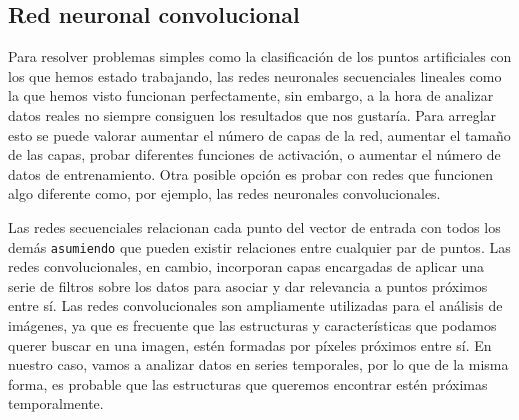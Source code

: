 \newpage
\subsection{Red neuronal convolucional}
Para resolver problemas simples como la clasificación de los puntos artificiales con los que hemos estado trabajando, las redes neuronales secuenciales lineales como la que hemos visto funcionan perfectamente, sin embargo, a la hora de analizar datos reales no siempre consiguen los resultados que nos gustaría. Para arreglar esto se puede valorar aumentar el número de capas de la red, aumentar el tamaño de las capas, probar diferentes funciones de activación, o aumentar el número de datos de entrenamiento. Otra posible opción es probar con redes que funcionen algo diferente como, por ejemplo, las redes neuronales convolucionales.

Las redes secuenciales relacionan cada punto del vector de entrada con todos los demás \texttt{asumiendo} que pueden existir relaciones entre cualquier par de puntos. Las redes convolucionales, en cambio, incorporan capas encargadas de aplicar una serie de filtros sobre los datos para asociar y dar relevancia a puntos próximos entre sí. Las redes convolucionales son ampliamente utilizadas para el análisis de imágenes, ya que es frecuente que las estructuras y características que podamos querer buscar en una imagen, estén formadas por píxeles próximos entre sí. En nuestro caso, vamos a analizar datos en series temporales, por lo que de la misma forma, es probable que las estructuras que queremos encontrar estén próximas temporalmente.


